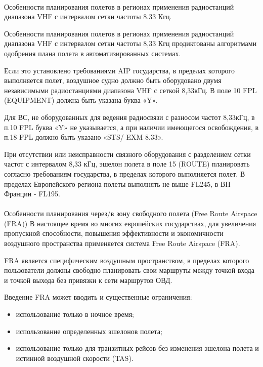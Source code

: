 \paragraph{} Особенности планирования полетов в регионах применения радиостанций диапазона VHF с интервалом сетки частоты 8.33 Кгц.

Особенности планирования полетов в регионах применения радиостанций диапазона VHF с интервалом сетки частоты 8,33 Кгц продиктованы алгоритмами одобрения плана полета в автоматизированных системах. 

Если это установлено требованиями AIP государства, в пределах которого выполняется полет, воздушное судно должно быть оборудовано двумя независимыми радиостанциями диапазона VHF с сеткой 8,33кГц. В поле 10 FPL (EQUIPMENT) должна быть указана буква «Y». 

Для ВС, не оборудованных для ведения радиосвязи с разносом частот 8,33кГц, в п.10 FPL буква «Y» не указывается, а при наличии имеющегося освобождения, в п.18 FPL должно быть указано «STS/ EXM 8.33». 

При отсутствии или неисправности связного оборудования с разделением сетки частот с интервалом 8,33 кГц, эшелон полета в поле 15 (ROUTE) планировать согласно требованиям государства, в пределах которого выполняется полет. В пределах Европейского региона полеты выполнять не выше FL245, в ВП Франции - FL195.

\paragraph{} Особенности планирования через/в зону свободного полета (Free Route Airspace (FRA)) 
В настоящее время во многих европейских государствах, для увеличения пропускной способности, повышения эффективности и экономичности воздушного пространства применяется система Free Route Airspace (FRA). 

FRA является специфическим воздушным пространством, в пределах которого пользователи должны свободно планировать свои маршруты между точкой входа и точкой выхода без привязки к сети маршрутов ОВД. 

Введение FRA может вводить и существенные ограничения: 
\begin{itemize}
    \item использование только в ночное время;
    \item использование определенных эшелонов полета;
    \item использование только для транзитных рейсов без изменения эшелона полета и истинной воздушной скорости (TAS).
\end{itemize}
	 
